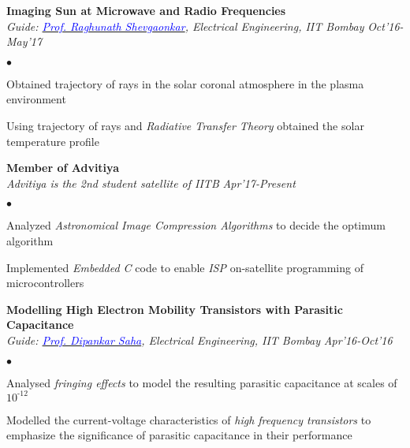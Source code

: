 \documentclass[margin,line, 9pt]{res}
\newenvironment{list2}{
  \begin{list}{$\bullet$}{%
      \setlength{\itemsep}{0.03in}
      \setlength{\parsep}{0in} \setlength{\parskip}{0in}
      \setlength{\topsep}{0in} \setlength{\partopsep}{0in} 
      \setlength{\leftmargin}{0.2in}}}{\end{list}}
\begin{document}
\begin{resume}
{\bf Imaging Sun at Microwave and Radio Frequencies} \\
{\em Guide: \href{https://www.ee.iitb.ac.in/wiki/faculty/rks}{\textcolor{blue}{Prof. Raghunath Shevgaonkar}}, Electrical Engineering, IIT Bombay} \hfill {\it Oct'16-May'17}\\
\vspace*{-.13in}
\begin{list2}
\item Obtained trajectory of rays in the solar coronal atmosphere in the plasma environment
\item Using trajectory of rays and \emph{Radiative Transfer Theory} obtained the solar temperature profile
\end{list2}


{\bf Member of Advitiya} \\
{\em Advitiya is the 2nd student satellite of IITB} \hfill {\it Apr'17-Present}\\
\vspace*{-.13in}
\begin{list2}
\item Analyzed \emph{Astronomical Image Compression Algorithms} to decide the optimum algorithm
\item Implemented \emph{Embedded C} code to enable \emph{ISP} on-satellite programming of microcontrollers
\end{list2}


{\bf Modelling High Electron Mobility Transistors with Parasitic Capacitance} \\
{\em Guide: \href{https://www.ee.iitb.ac.in/wiki/faculty/dsaha}{\textcolor{blue}{Prof. Dipankar Saha}}, Electrical Engineering, IIT Bombay} \hfill {\it Apr'16-Oct'16}\\
\vspace*{-.13in}
\begin{list2}
\item Analysed \emph{fringing effects} to model the resulting parasitic capacitance at scales of $10^\text{-12}$ 
\item Modelled the current-voltage characteristics of \emph{high frequency transistors} to emphasize the significance of parasitic capacitance in their performance
\end{list2}





\end{resume}
\end{document}
